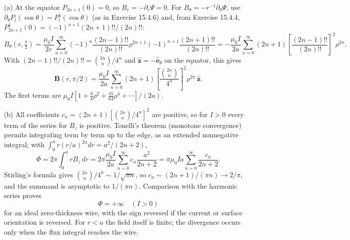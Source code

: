 (a) At the equator $P_{2n+1}(0)=0$, so $B_r=-\partial_r\Psi=0$.
For $B_\theta=-r^{-1}\partial_\theta\Psi$, use
$\partial_\theta P_l(\cos\theta)=P_l^1(\cos\theta)$ (as in
Exercise 15.4.6) and, from Exercise 15.4.4,
$P_{2n+1}^1(0)=(-1)^{n+1}(2n+1)!!/(2n)!!$:
\[
B_\theta(r,\tfrac\pi2)=\frac{\mu_0I}{2r}\sum_{n=0}^\infty
(-1)^n\frac{(2n-1)!!}{(2n)!!}\rho^{2n+1}
(-1)^{n+1}\frac{(2n+1)!!}{(2n)!!}
=-\frac{\mu_0I}{2a}\sum_{n=0}^\infty
(2n+1)\left[\frac{(2n-1)!!}{(2n)!!}\right]^2\rho^{2n}.
\]
With $(2n-1)!!/(2n)!!=\binom{2n}{n}/4^n$ and
$\hat{\mathbf z}=-\hat{\mathbf e}_\theta$ on the equator, this gives
\[
\boxed{\mathbf B(r,\pi/2)=
\frac{\mu_0I}{2a}\sum_{n=0}^\infty
(2n+1)\left[\frac{\binom{2n}{n}}{4^n}\right]^2
\rho^{2n}\,\hat{\mathbf z}}.
\]
The first terms are
$\mu_0I[1+\tfrac34\rho^2+\tfrac{45}{64}\rho^4+\cdots]/(2a)$.

(b) All coefficients $c_n=(2n+1)[\binom{2n}{n}/4^n]^2$ are positive,
so for $I>0$ every term of the series for $B_z$ is positive. Tonelli's
theorem (monotone convergence) permits
integrating term by term up to the edge, as an extended nonnegative
integral; with $\int_0^ar(r/a)^{2n}dr=a^2/(2n+2)$,
\[
\Phi=2\pi\int_0^arB_z\,dr
=2\pi\frac{\mu_0I}{2a}\sum_{n=0}^\infty c_n\frac{a^2}{2n+2}
=\pi\mu_0Ia\sum_{n=0}^\infty\frac{c_n}{2n+2}.
\]
Stirling's formula gives $\binom{2n}{n}/4^n\sim1/\sqrt{\pi n}$, so
$c_n\sim(2n+1)/(\pi n)\to2/\pi$, and the summand is asymptotic
to $1/(\pi n)$. Comparison with the harmonic series proves
\[
\boxed{\Phi=+\infty\quad(I>0)}
\]
for an ideal zero-thickness wire, with the sign reversed if the
current or surface orientation is reversed.
For $r<a$ the field itself is finite; the divergence occurs only
when the flux integral reaches the wire.

